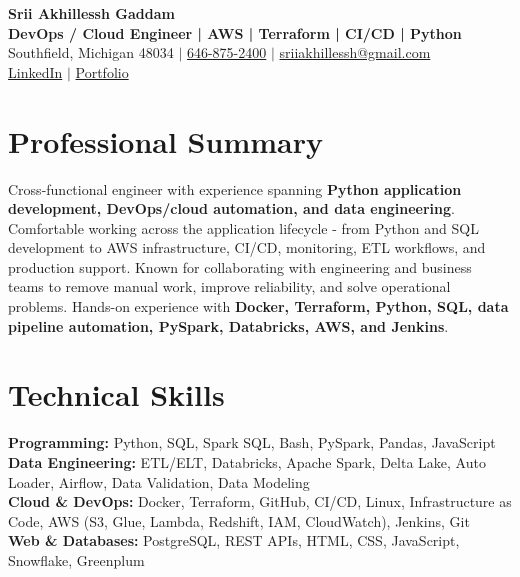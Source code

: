 \documentclass[letterpaper,10pt]{article}
\begin{document}
\fontsize{9.35pt}{10.45pt}\selectfont

\begin{center}
    {\LARGE \textbf{Srii Akhillessh Gaddam}} \\[-1pt]
    \textbf{DevOps / Cloud Engineer | AWS | Terraform | CI/CD | Python} \\[2pt]
    Southfield, Michigan 48034 $|$
    \href{tel:6468752400}{646-875-2400} $|$
    \href{mailto:sriiakhillessh@gmail.com}{sriiakhillessh@gmail.com} \\[1pt]
    \href{https://www.linkedin.com/in/srii-akhiilessh-gaddam-b48668191/}{LinkedIn} $|$
    \href{https://sriiakhillesshg.github.io/portfolio/}{Portfolio}
\end{center}
\vspace{-8pt}

\section{Professional Summary}
\small{Cross-functional engineer with experience spanning \textbf{Python application development, DevOps/cloud automation, and data engineering}. Comfortable working across the application lifecycle - from Python and SQL development to AWS infrastructure, CI/CD, monitoring, ETL workflows, and production support. Known for collaborating with engineering and business teams to remove manual work, improve reliability, and solve operational problems. Hands-on experience with \textbf{Docker, Terraform, Python, SQL, data pipeline automation, PySpark, Databricks, AWS, and Jenkins}.}

\section{Technical Skills}
\small{
\textbf{Programming:} Python, SQL, Spark SQL, Bash, PySpark, Pandas, JavaScript \\
\textbf{Data Engineering:} ETL/ELT, Databricks, Apache Spark, Delta Lake, Auto Loader, Airflow, Data Validation, Data Modeling \\
\textbf{Cloud \& DevOps:} Docker, Terraform, GitHub, CI/CD, Linux, Infrastructure as Code, AWS (S3, Glue, Lambda, Redshift, IAM, CloudWatch), Jenkins, Git \\
\textbf{Web \& Databases:} PostgreSQL, REST APIs, HTML, CSS, JavaScript, Snowflake, Greenplum
}
\end{document}
